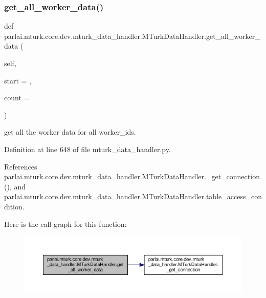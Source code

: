 \subsubsection{\texorpdfstring{get\+\_\+all\+\_\+worker\+\_\+data()}{get\_all\_worker\_data()}}
{\footnotesize\ttfamily def parlai.\+mturk.\+core.\+dev.\+mturk\+\_\+data\+\_\+handler.\+M\+Turk\+Data\+Handler.\+get\+\_\+all\+\_\+worker\+\_\+data (\begin{DoxyParamCaption}\item[{}]{self,  }\item[{}]{start = {},  }\item[{}]{count = {} }\end{DoxyParamCaption})}

\begin{DoxyVerb}get all the worker data for all worker_ids.\end{DoxyVerb}
 

Definition at line 648 of file mturk\+\_\+data\+\_\+handler.\+py.



References parlai.\+mturk.\+core.\+dev.\+mturk\+\_\+data\+\_\+handler.\+M\+Turk\+Data\+Handler.\+\_\+get\+\_\+connection(), and parlai.\+mturk.\+core.\+dev.\+mturk\+\_\+data\+\_\+handler.\+M\+Turk\+Data\+Handler.\+table\+\_\+access\+\_\+condition.

Here is the call graph for this function\+:
\nopagebreak
\begin{figure}[H]
\begin{center}
\leavevmode
\includegraphics[width=350pt]{classparlai_1_1mturk_1_1core_1_1dev_1_1mturk__data__handler_1_1MTurkDataHandler_a3e7435a5ea6af94b4d668c095184a234_cgraph}
\end{center}
\end{figure}
\mbox{\label{classparlai_1_1mturk_1_1core_1_1dev_1_1mturk__data__handler_1_1MTurkDataHandler_a70ee72567e0c94eea130cdee21549ada}} 
